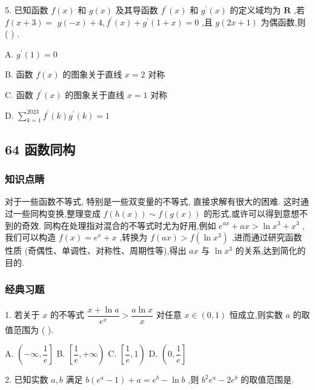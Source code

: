5. 已知函数 $f\left( x\right)$ 和 $g\left( x\right)$ 及其导函数 ${f}^{\prime }\left( x\right)$ 和 ${g}^{\prime }\left( x\right)$ 的定义域均为 $\mathbf{R}$ ,若 $f\left( {x + 3}\right)  =$  $g\left( {-x}\right)  + 4,{f}^{\prime }\left( x\right)  + {g}^{\prime }\left( {1 + x}\right)  = 0$ ,且 $g\left( {{2x} + 1}\right)$ 为偶函数,则 (   ) .

A. ${g}^{\prime }\left( 1\right)  = 0$

B. 函数 $f\left( x\right)$ 的图象关于直线 $x = 2$ 对称

C. 函数 ${f}^{\prime }\left( x\right)$ 的图象关于直线 $x = 1$ 对称

D. $\mathop{\sum }\limits_{{k = 1}}^{{2023}}{f}^{\prime }\left( k\right) {g}^{\prime }\left( k\right)  = 1$

\subsection*{64 函数同构}

\subsubsection*{知识点睛}

对于一些函数不等式, 特别是一些双变量的不等式, 直接求解有很大的困难. 这时通过一些同构变换,整理变成 $f\left( {h\left( x\right) }\right)  \sim  f\left( {g\left( x\right) }\right)$ 的形式,或许可以得到意想不到的奇效. 同构在处理指对混合的不等式时尤为好用,例如 ${{e}}^{ax} + {ax} > \ln {x}^{3} + {x}^{3}$ ,我们可以构造 $f\left( x\right)  = {{e}}^{x} + x$ ,转换为 $f\left( {ax}\right)  > f\left( {\ln {x}^{3}}\right)$ ,进而通过研究函数性质 (奇偶性、单调性、对称性、周期性等),得出 ${ax}$ 与 $\ln {x}^{3}$ 的关系,达到简化的目的.

\subsubsection*{经典习题}

1. 若关于 $x$ 的不等式 $\dfrac{x + \ln a}{{{e}}^{x}} > \dfrac{a\ln x}{x}$ 对任意 $x \in  \left( {0,1}\right)$ 恒成立,则实数 $a$ 的取值范围为 (   ).

A. $\left( {-\infty ,\dfrac{1}{{e}}}\right\rbrack$ B. $\left\lbrack  {\dfrac{1}{{e}}, + \infty }\right)$ C. $\left\lbrack  {\dfrac{1}{{e}},1}\right)$ D. $\left( {0,\dfrac{1}{{e}}}\right\rbrack$

2. 已知实数 $a,b$ 满足 $b\left( {{{e}}^{a} - 1}\right)  + a = {{e}}^{b} - \ln b$ ,则 ${b}^{2}{{e}}^{a} - 2{{e}}^{b}$ 的取值范围是\blkda{}.

